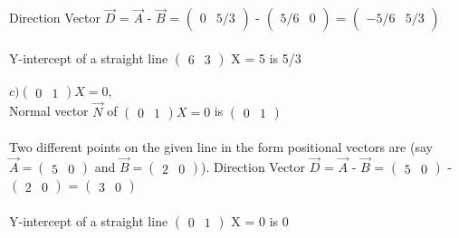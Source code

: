 \documentclass[journal,12pt,twocolumn]{IEEEtran}
\begin{document}
Direction Vector $\vec{D}$ = $\vec{A}$ - $\vec{B}$ = $\begin{pmatrix} 0 & 5/3 \end{pmatrix} $ - $\begin{pmatrix} 5/6 & 0 \end{pmatrix} $ = $\begin{pmatrix} -5/6 & 5/3 \end{pmatrix} $
\\
\\
Y-intercept of a straight line $\begin{pmatrix} 6 & 3\end{pmatrix}$ X = 5 is 5/3
\\
\\
$
c) \begin{pmatrix} 0 & 1\end{pmatrix} X = 0,
$
\\
Normal vector $\vec{N}$ of $ \begin{pmatrix} 0 & 1\end{pmatrix} X = 0 $ is  $ \begin{pmatrix} 0 & 1\end{pmatrix} $ 
\\
\\
Two different points on the given line in the form positional vectors are (say $\vec{A} = \begin{pmatrix} 5 & 0 \end{pmatrix} $ and $\vec{B} = \begin{pmatrix} 2 & 0 \end{pmatrix} $).
Direction Vector $\vec{D}$ = $\vec{A}$ - $\vec{B}$ = $\begin{pmatrix} 5 & 0 \end{pmatrix} $ - $\begin{pmatrix} 2 & 0 \end{pmatrix} $ = $\begin{pmatrix} 3 & 0 \end{pmatrix} $
\\
\\
Y-intercept of a straight line $\begin{pmatrix} 0 & 1\end{pmatrix}$ X = 0 is 0
\end{document}
